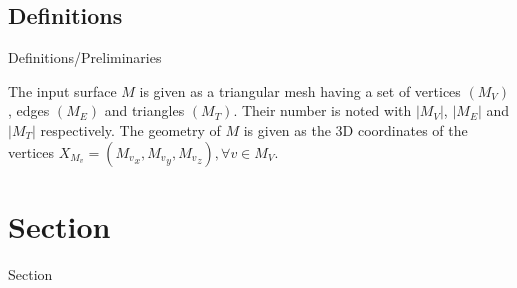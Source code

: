 \documentclass[a4paper]{report}
\begin{document}
\bigskip
\subsection{Definitions}
{  Definitions/Preliminaries

The input surface $M$ is given as a triangular 
mesh having a set of vertices $({M_V})$, edges $({M_E})$ and triangles $({M_T})$.
Their number is noted with $|M_V|$, $|M_E|$ and $|M_T|$ respectively.
The geometry of $M$ is given as the 3D coordinates of the vertices $X_{M_v}=({{M_v}_x},{{M_v}_y},{{M_v}_z}), \forall v\in{M_V}$. 


}

\newpage
\section{Section}
{ Section

}


\newpage
\end{document}
